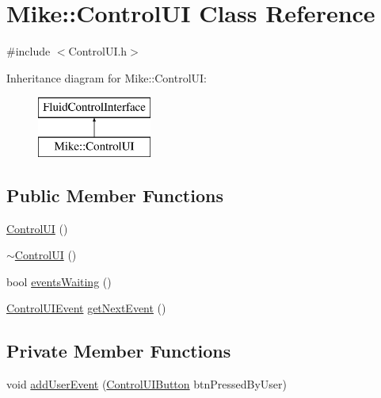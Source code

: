 \hypertarget{class_mike_1_1_control_u_i}{}\section{Mike\+:\+:Control\+UI Class Reference}
\label{class_mike_1_1_control_u_i}


{\ttfamily \#include $<$Control\+U\+I.\+h$>$}

Inheritance diagram for Mike\+:\+:Control\+UI\+:\begin{figure}[H]
\begin{center}
\leavevmode
\includegraphics[height=2.000000cm]{class_mike_1_1_control_u_i}
\end{center}
\end{figure}
\subsection*{Public Member Functions}
\begin{DoxyCompactItemize}
\item 
\hyperlink{class_mike_1_1_control_u_i_ab62701989c636033cd6756c332a43513}{Control\+UI} ()
\item 
\hyperlink{class_mike_1_1_control_u_i_af2e1bde555402a1035d7f8e2b1525b50}{$\sim$\+Control\+UI} ()
\item 
bool \hyperlink{class_mike_1_1_control_u_i_afb11a656dc093a18fd3f12f9b9709418}{events\+Waiting} ()
\item 
\hyperlink{struct_mike_1_1_control_u_i_event}{Control\+U\+I\+Event} \hyperlink{class_mike_1_1_control_u_i_ae5bb9cf35b75c37381573ce7469504f1}{get\+Next\+Event} ()
\end{DoxyCompactItemize}
\subsection*{Private Member Functions}
\begin{DoxyCompactItemize}
\item 
void \hyperlink{class_mike_1_1_control_u_i_abcc1603903c8fd267ca9ce1a559266a9}{add\+User\+Event} (\hyperlink{namespace_mike_ab036b30a5fb5ef61314086e0c2c5ca6a}{Control\+U\+I\+Button} btn\+Pressed\+By\+User)
\end{DoxyCompactItemize}
